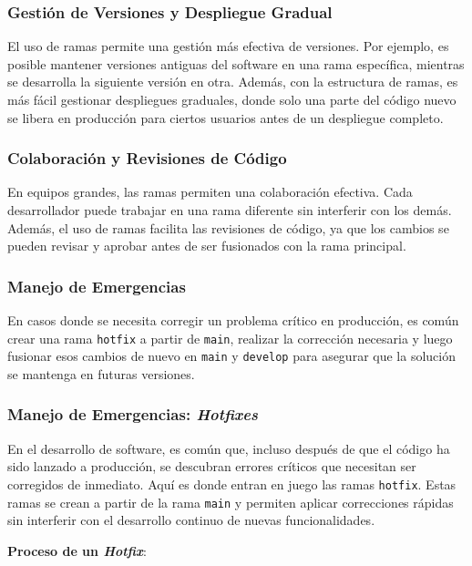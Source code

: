 \documentclass{template/uem_theme}
\begin{document}
\subsubsection{Gestión de Versiones y Despliegue Gradual}

El uso de ramas permite una gestión más efectiva de versiones. Por ejemplo, es posible mantener versiones antiguas del software en una rama específica, mientras se desarrolla la siguiente versión en otra. Además, con la estructura de ramas, es más fácil gestionar despliegues graduales, donde solo una parte del código nuevo se libera en producción para ciertos usuarios antes de un despliegue completo.

\subsubsection{Colaboración y Revisiones de Código}

En equipos grandes, las ramas permiten una colaboración efectiva. Cada desarrollador puede trabajar en una rama diferente sin interferir con los demás. Además, el uso de ramas facilita las revisiones de código, ya que los cambios se pueden revisar y aprobar antes de ser fusionados con la rama principal.

\subsubsection{Manejo de Emergencias}

En casos donde se necesita corregir un problema crítico en producción, es común crear una rama \texttt{hotfix} a partir de \texttt{main}, realizar la corrección necesaria y luego fusionar esos cambios de nuevo en \texttt{main} y \texttt{develop} para asegurar que la solución se mantenga en futuras versiones.
\subsubsection{Manejo de Emergencias: \textit{Hotfixes}}

En el desarrollo de software, es común que, incluso después de que el código ha sido lanzado a producción, se descubran errores críticos que necesitan ser corregidos de inmediato. Aquí es donde entran en juego las ramas \texttt{hotfix}. Estas ramas se crean a partir de la rama \texttt{main} y permiten aplicar correcciones rápidas sin interferir con el desarrollo continuo de nuevas funcionalidades.

\textbf{Proceso de un \textit{Hotfix}}:
\end{document}

